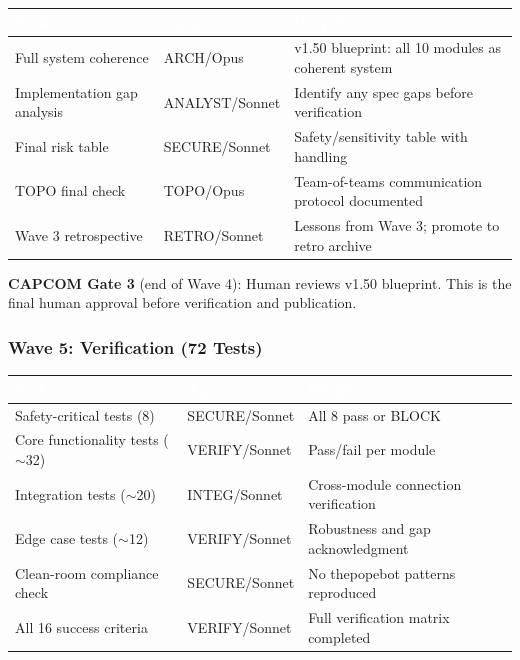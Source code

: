 \documentclass[11pt,letterpaper]{article}
\newcommand{\tableheader}[1]{\textbf{\sffamily\textcolor{white}{#1}}}
\begin{document}
\begin{center}
\begin{tabularx}{\textwidth}{L{4cm}L{2cm}X}
\toprule
{}
\tableheader{Task} & \tableheader{Agent} & \tableheader{Output} \\
\midrule
Full system coherence & ARCH/Opus & v1.50 blueprint: all 10 modules as coherent system \\
Implementation gap analysis & ANALYST/Sonnet & Identify any spec gaps before verification \\
Final risk table & SECURE/Sonnet & Safety/sensitivity table with handling \\
TOPO final check & TOPO/Opus & Team-of-teams communication protocol documented \\
Wave 3 retrospective & RETRO/Sonnet & Lessons from Wave 3; promote to retro archive \\
\end{tabularx}
\end{center}

\textbf{CAPCOM Gate 3} (end of Wave 4): Human reviews v1.50 blueprint. This is the final human approval before verification and publication.

\subsubsection{Wave 5: Verification (72 Tests)}

\begin{center}
\begin{tabularx}{\textwidth}{L{4cm}L{2cm}X}
\toprule
{}
\tableheader{Task} & \tableheader{Agent} & \tableheader{Output} \\
\midrule
Safety-critical tests (8) & SECURE/Sonnet & All 8 pass or BLOCK \\
Core functionality tests ($\sim$32) & VERIFY/Sonnet & Pass/fail per module \\
Integration tests ($\sim$20) & INTEG/Sonnet & Cross-module connection verification \\
Edge case tests ($\sim$12) & VERIFY/Sonnet & Robustness and gap acknowledgment \\
Clean-room compliance check & SECURE/Sonnet & No thepopebot patterns reproduced \\
All 16 success criteria & VERIFY/Sonnet & Full verification matrix completed \\
\end{tabularx}
\end{center}
\end{document}
